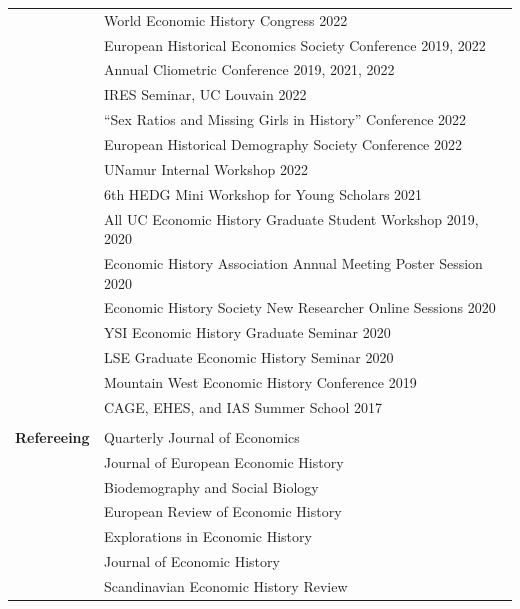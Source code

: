 \documentclass[a4paper,11pt,oneside]{article}
\begin{document}
\begin{longtable}{@{} p{0.175\linewidth} p{0.775\linewidth} p{0.05\linewidth}}
   & \multicolumn{2}{l}{World Economic History Congress  \hfill 2022} \\
   & \multicolumn{2}{l}{  European Historical Economics Society Conference   \hfill 2019, 2022} \\
   & \multicolumn{2}{l}{ Annual Cliometric Conference    \hfill 2019, 2021, 2022} \\
   & \multicolumn{2}{l}{IRES Seminar, UC Louvain \hfill 2022 }\\
   &  \multicolumn{2}{l}{``Sex Ratios and Missing Girls in History'' Conference \hfill 2022}\\
   & \multicolumn{2}{l}{European Historical Demography Society Conference \hfill 2022 }\\
   & \multicolumn{2}{l}{UNamur Internal Workshop \hfill 2022 }\\
   &  \multicolumn{2}{l}{ 6th HEDG Mini Workshop for Young Scholars   \hfill 2021}\\
   & \multicolumn{2}{l}{ All UC Economic History Graduate Student Workshop  \hfill 2019, 2020}\\
   & \multicolumn{2}{l}{ Economic History Association Annual Meeting Poster Session \hfill  2020}\\
   &\multicolumn{2}{l}{  Economic History Society New Researcher Online Sessions \hfill 2020}\\
   &  \multicolumn{2}{l}{YSI Economic History Graduate Seminar \hfill 2020}\\
   &  \multicolumn{2}{l}{LSE Graduate Economic History Seminar \hfill  2020}\\
   & \multicolumn{2}{l}{ Mountain West Economic History Conference  \hfill  2019}\\
   &  \multicolumn{2}{l}{CAGE, EHES, and IAS Summer School  \hfill  2017}\\
   \\
   \textbf{\large{Refereeing}} & Quarterly Journal of Economics &\\
   & Journal of European Economic History &\\
   & Biodemography and Social Biology & \\
   &  European Review of Economic History &\\
    & Explorations in Economic History     &\\
    & Journal of Economic History & \\
    & Scandinavian Economic History Review  & \\
 
\end{longtable}
\end{document}
